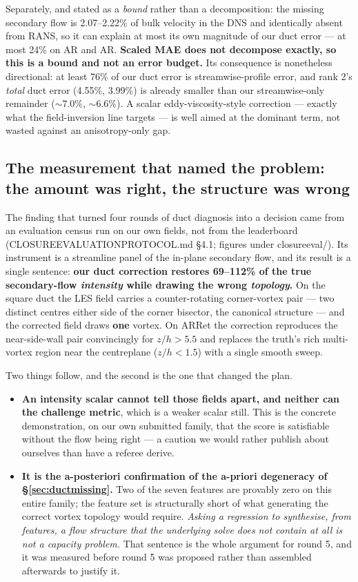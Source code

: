 \documentclass[11pt,a4paper]{article}
\newcommand{\breakus}{\textunderscore\allowbreak}
\newcommand{\code}[1]{{\small\ttfamily\let\_\breakus #1}}
\newcommand{\artifact}[1]{{\footnotesize\ttfamily\let\_\breakus #1}}
\begin{document}
Separately, and stated as a \emph{bound} rather than a decomposition: the missing secondary
flow is 2.07--2.22\% of bulk velocity in the DNS and identically absent from RANS, so it can
explain at most its own magnitude of our duct error --- at most 24\% on \code{AR\_1} and
\code{AR\_3}. \textbf{Scaled MAE does not decompose exactly, so this is a bound and not an
error budget.} Its consequence is nonetheless directional: at least 76\% of our duct error
is streamwise-profile error, and rank 2's \emph{total} duct error (4.55\%, 3.99\%) is
already smaller than our streamwise-only remainder ($\sim$7.0\%, $\sim$6.6\%). A scalar
eddy-viscosity-style correction --- exactly what the field-inversion line targets --- is
well aimed at the dominant term, not wasted against an anisotropy-only gap.

\subsection{The measurement that named the problem: the amount was right, the structure was
wrong}
\label{sec:census}

The finding that turned four rounds of duct diagnosis into a decision came from an
evaluation census run on our own fields, not from the leaderboard
(\artifact{CLOSURE\_EVALUATION\_PROTOCOL.md} \S4.1; figures under
\artifact{closure\_eval/}). Its instrument is a streamline panel of the in-plane secondary
flow, and its result is a single sentence: \textbf{our duct correction restores 69--112\% of
the true secondary-flow \emph{intensity} while drawing the wrong \emph{topology}.} On the
square duct the LES field carries a counter-rotating corner-vortex pair --- two distinct
centres either side of the corner bisector, the canonical structure --- and the corrected
field draws \textbf{one} vortex. On \code{AR\_7\_Ret\_180} the correction reproduces the
near-side-wall pair convincingly for $z/h > 5.5$ and replaces the truth's rich multi-vortex
region near the centreplane ($z/h < 1.5$) with a single smooth sweep.

Two things follow, and the second is the one that changed the plan.

\begin{itemize}
\item \textbf{An intensity scalar cannot tell those fields apart, and neither can the
  challenge metric}, which is a weaker scalar still. This is the concrete demonstration,
  on our own submitted family, that the score is satisfiable without the flow being right
  --- a caution we would rather publish about ourselves than have a referee derive.
\item \textbf{It is the a-posteriori confirmation of the a-priori degeneracy of
  \S\ref{sec:ductmissing}.} Two of the seven features are provably zero on this entire
  family; the feature set is structurally short of what generating the correct vortex
  topology would require. \emph{Asking a regression to synthesise, from features, a flow
  structure that the underlying solve does not contain at all is not a capacity problem.}
  That sentence is the whole argument for round 5, and it was measured before round 5 was
  proposed rather than assembled afterwards to justify it.
\end{itemize}
\end{document}
